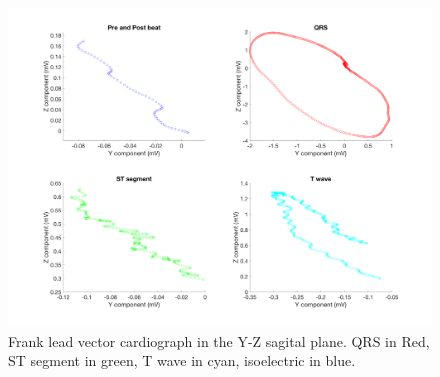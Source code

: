 \documentclass[12pt]{article}
\begin{document}
\begin{figure}[H]
	
	\centering
	\includegraphics[width = .75\textwidth]{Figures/FrankLeads_yz.png}
	\caption{ Frank lead vector cardiograph in the Y-Z sagital plane. QRS in Red, ST segment in green, T wave in cyan, isoelectric in blue.}
	\label{fig:Frank_yz}
\end{figure}
\end{document}
